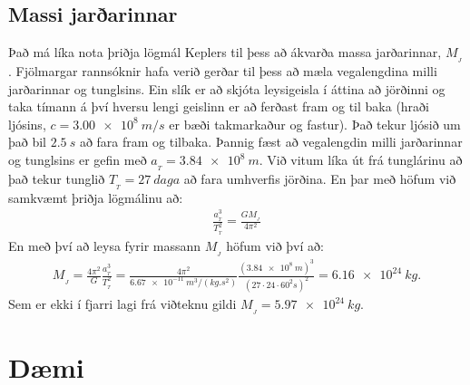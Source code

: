 \subsection*{Massi jarðarinnar}

Það má líka nota þriðja lögmál Keplers til þess að ákvarða massa jarðarinnar, $M_{_J}$. Fjölmargar rannsóknir hafa verið gerðar til þess að mæla vegalengdina milli jarðarinnar og tunglsins. Ein slík er að skjóta leysigeisla í áttina að jörðinni og taka tímann á því hversu lengi geislinn er að ferðast fram og til baka (hraði ljósins, $c = \SI{3.00e8}{m/s}$ er bæði takmarkaður og fastur). Það tekur ljósið um það bil $\SI{2.5}{s}$ að fara fram og tilbaka. Þannig fæst að vegalengdin milli jarðarinnar og tunglsins er gefin með $a_{_{T}} = \SI{3.84e8}{m}$. Við vitum líka út frá tunglárinu að það tekur tunglið $T_{_{T}} = \SI{27}{daga}$ að fara umhverfis jörðina. En þar með höfum við samkvæmt þriðja lögmálinu að:
\begin{align*}
    \frac{a_{_T}^3}{T_{_{T}}^2} = \frac{GM_{_J}}{4\pi^2}
\end{align*}
En með því að leysa fyrir massann $M_{_J}$ höfum við því að:
\begin{align*}
    M_{_{J}} = \frac{4\pi^2}{G} \frac{a_{_T}^3}{T_{_{T}}^2} = \frac{4\pi^2}{\SI{6.67e-11}{m^3/(kg.s^2)}} \frac{(\SI{3.84e8}{m})^3}{(27 \cdot 24 \cdot 60^2 \si{s})^2} = \SI{6.16e24}{kg}.
\end{align*}
Sem er ekki í fjarri lagi frá viðteknu gildi $M_{_J} = \SI{5.97e24}{kg}$.

\newpage

\section{Dæmi}

